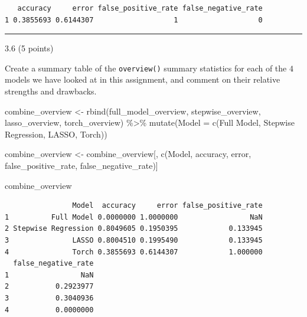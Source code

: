 \documentclass[
  letterpaper,
  DIV=11,
  numbers=noendperiod]{scrartcl}
\newenvironment{Shaded}{\begin{snugshade}}{\end{snugshade}}
\newcommand{\AttributeTok}[1]{\textcolor[rgb]{0.40,0.45,0.13}{#1}}
\newcommand{\FunctionTok}[1]{\textcolor[rgb]{0.28,0.35,0.67}{#1}}
\newcommand{\NormalTok}[1]{\textcolor[rgb]{0.00,0.23,0.31}{#1}}
\newcommand{\OtherTok}[1]{\textcolor[rgb]{0.00,0.23,0.31}{#1}}
\newcommand{\SpecialCharTok}[1]{\textcolor[rgb]{0.37,0.37,0.37}{#1}}
\newcommand{\StringTok}[1]{\textcolor[rgb]{0.13,0.47,0.30}{#1}}
\begin{document}
\begin{verbatim}
   accuracy     error false_positive_rate false_negative_rate
1 0.3855693 0.6144307                   1                   0
\end{verbatim}

\begin{center}\rule{0.5\linewidth}{0.5pt}\end{center}

3.6 (5 points)

Create a summary table of the \texttt{overview()} summary statistics for
each of the \(4\) models we have looked at in this assignment, and
comment on their relative strengths and drawbacks.

\begin{Shaded}
\begin{Highlighting}[]
\NormalTok{combine\_overview }\OtherTok{\textless{}{-}} \FunctionTok{rbind}\NormalTok{(full\_model\_overview, stepwise\_overview, lasso\_overview, torch\_overview) }\SpecialCharTok{\%\textgreater{}\%}
  \FunctionTok{mutate}\NormalTok{(}\AttributeTok{Model =} \FunctionTok{c}\NormalTok{(}\StringTok{\textquotesingle{}Full Model\textquotesingle{}}\NormalTok{, }\StringTok{\textquotesingle{}Stepwise Regression\textquotesingle{}}\NormalTok{, }\StringTok{\textquotesingle{}LASSO\textquotesingle{}}\NormalTok{, }\StringTok{\textquotesingle{}Torch\textquotesingle{}}\NormalTok{))}
  
\NormalTok{combine\_overview }\OtherTok{\textless{}{-}}\NormalTok{ combine\_overview[, }\FunctionTok{c}\NormalTok{(}\StringTok{\textquotesingle{}Model\textquotesingle{}}\NormalTok{, }\StringTok{\textquotesingle{}accuracy\textquotesingle{}}\NormalTok{, }\StringTok{\textquotesingle{}error\textquotesingle{}}\NormalTok{, }\StringTok{\textquotesingle{}false\_positive\_rate\textquotesingle{}}\NormalTok{, }\StringTok{\textquotesingle{}false\_negative\_rate\textquotesingle{}}\NormalTok{)]}

\NormalTok{combine\_overview}
\end{Highlighting}
\end{Shaded}

\begin{verbatim}
                Model  accuracy     error false_positive_rate
1          Full Model 0.0000000 1.0000000                 NaN
2 Stepwise Regression 0.8049605 0.1950395            0.133945
3               LASSO 0.8004510 0.1995490            0.133945
4               Torch 0.3855693 0.6144307            1.000000
  false_negative_rate
1                 NaN
2           0.2923977
3           0.3040936
4           0.0000000
\end{verbatim}
\end{document}
